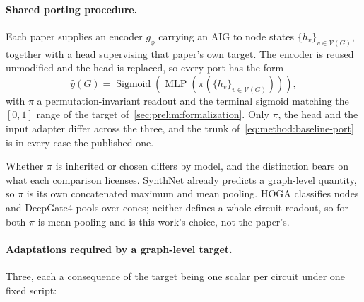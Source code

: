 \paragraph{Shared porting procedure.}
Each paper supplies an encoder $g_\phi$ carrying an AIG to node states
$\{ h_v \}_{v \in \mathcal{V}(G)}$, together with a head supervising that paper's own
target. The encoder is reused unmodified and the head is replaced, so every port has the
form
\begin{equation}
    \hat{y}(G) = \operatorname{Sigmoid}\!\left(
        \operatorname{MLP}\!\left(
            \pi\!\left( \{ h_v \}_{v \in \mathcal{V}(G)} \right)
        \right) \right),
    \label{eq:method:baseline-port}
\end{equation}
with $\pi$ a permutation-invariant readout and the terminal sigmoid matching the $[0,1]$
range of the target of~\ref{sec:prelim:formalization}. Only $\pi$, the head and the input
adapter differ across the three, and the trunk of~\eqref{eq:method:baseline-port} is in
every case the published one.

Whether $\pi$ is inherited or chosen differs by model, and the distinction bears on what
each comparison licenses. SynthNet already predicts a graph-level quantity, so $\pi$ is its
own concatenated maximum and mean pooling. HOGA classifies nodes and DeepGate4 pools over
cones; neither defines a whole-circuit readout, so for both $\pi$ is mean pooling and is
this work's choice, not the paper's.

\paragraph{Adaptations required by a graph-level target.}
Three, each a consequence of the target being one scalar per circuit under one fixed script:

